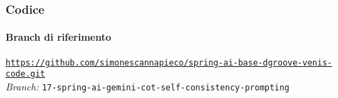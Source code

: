 %
\begin{frame}[fragile] \frametitle{Codice}
    \framesubtitle{Branch di riferimento}
	\begin{center}
		{\scriptsize \href{https://github.com/simonescannapieco/spring-ai-base-dgroove-venis-code.git}{\texttt{https://github.com/simonescannapieco/spring-ai-base-dgroove-venis-code.git}}}\\
		\textit{Branch:} \alert{\texttt{17-spring-ai-gemini-cot-self-consistency-prompting}}
	\end{center}
\end{frame}